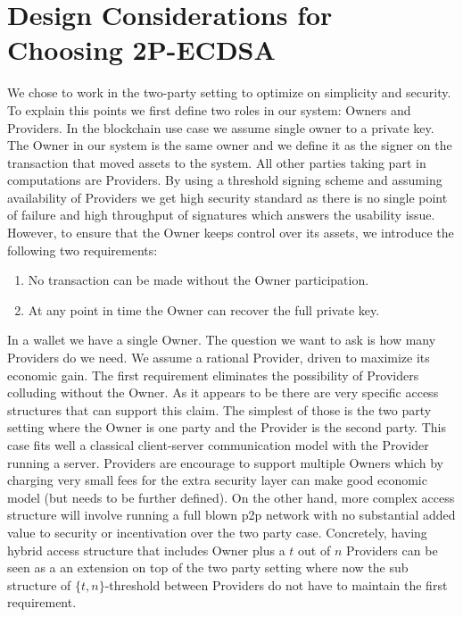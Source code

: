 \documentclass[runningheads]{llncs}
\begin{document}
\section{Design Considerations for Choosing 2P-ECDSA}
We chose to work in the two-party setting to optimize on simplicity and security. To explain this points we first define two roles in our system: Owners and Providers. In the blockchain use case we assume single owner to a private key. The Owner in our system is the same owner and we define it as the signer on the transaction that moved assets to the system. All other parties taking part in computations are Providers. By using a threshold signing scheme and assuming availability of Providers we get high security standard as there is no single point of failure and high throughput of signatures which answers the usability issue. However, to ensure that the Owner keeps control over its assets, we introduce the following two requirements: 
\begin{enumerate}
    \item No transaction can be made without the Owner participation.
    \item At any point in time the Owner can recover the full private key.
\end{enumerate}
In a wallet we have a single Owner. The question we want to ask is how many Providers do we need. We assume a rational Provider, driven to maximize its economic gain. The first requirement eliminates the  possibility of Providers colluding without the Owner. As it appears to be there are very specific access structures that can support this claim. The simplest of those is the two party setting where the Owner is one party and the Provider is the second party. This case fits well a classical client-server communication model with the Provider running a server. Providers are encourage to support multiple Owners which by charging very small fees for the extra security layer can make good economic model (but needs to be further defined). On the other hand, more complex access structure will involve running a full blown p2p network with no substantial added value to security or incentivation over the two party case. Concretely, having hybrid access structure that includes Owner plus a $t$ out of $n$ Providers can be seen as a an extension on top of the two party setting where now the sub structure of $\{t,n\}$-threshold between Providers do not have to maintain the first requirement. 
\end{document}

